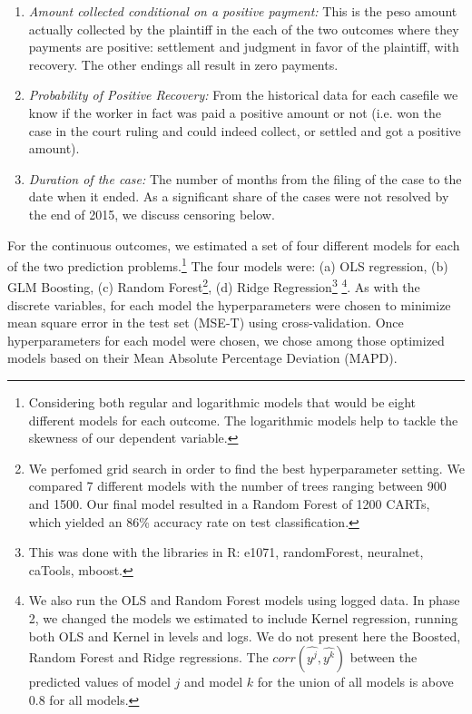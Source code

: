\begin{enumerate}
\item \textit{Amount collected conditional on a positive payment:} This is the peso amount actually collected by the plaintiff in the each of the two outcomes where they payments are positive: settlement and judgment in favor of the plaintiff, with recovery. The other endings all result in zero payments. 
\item \textit{Probability of Positive Recovery:} From the historical data for each casefile we know if the worker in fact was paid a positive amount or not (i.e. won the case in the court ruling and could indeed collect, or settled and got a positive amount).
\item \textit{Duration of the case:} The number of months from the filing of the case to the date when it ended. As a significant share of the cases were not resolved by the end of 2015, we discuss censoring below.
\end{enumerate}

For the continuous outcomes, we estimated a set of four different models for each of the two prediction problems.\footnote{Considering both regular and logarithmic models that would be eight different models for each outcome. The logarithmic models help to tackle the skewness of our dependent variable.} The four models were: (a) OLS regression, (b) GLM Boosting, (c) Random Forest\footnote{We perfomed grid search in order to find the best hyperparameter setting. We compared 7 different models with the number of trees ranging between 900 and 1500. Our final model resulted in a Random Forest of 1200 CARTs, which yielded an 86\% accuracy rate on test classification.}, (d) Ridge Regression\footnote{This was done with the libraries in R: e1071, randomForest, neuralnet, caTools, mboost.} \footnote{We also run the OLS and Random Forest models using logged data. In phase 2, we changed the models we estimated to include Kernel regression, running both OLS and Kernel in levels and logs. We do not present here the Boosted, Random Forest and Ridge regressions. The $corr(\hat{y^{j}},\hat{y^{k}})$ between the predicted values of model $j$ and model $k$ for the union of all models is above 0.8 for all models.}. As with the discrete variables, for each model the hyperparameters were chosen to minimize mean square error in the test set (MSE-T) using cross-validation. Once hyperparameters for each model were chosen, we chose among those optimized models based on their Mean Absolute Percentage Deviation (MAPD). 

